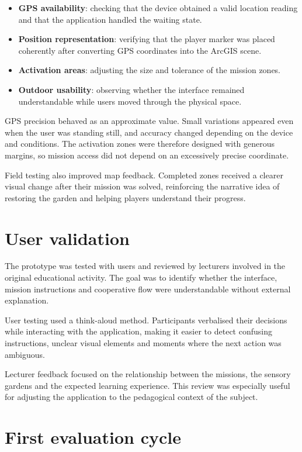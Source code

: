\begin{itemize}
    \item \textbf{GPS availability}: checking that the device obtained a valid location reading and that the application handled the waiting state.
    \item \textbf{Position representation}: verifying that the player marker was placed coherently after converting GPS coordinates into the ArcGIS scene.
    \item \textbf{Activation areas}: adjusting the size and tolerance of the mission zones.
    \item \textbf{Outdoor usability}: observing whether the interface remained understandable while users moved through the physical space.
\end{itemize}

GPS precision behaved as an approximate value. Small variations appeared even when the user was standing still, and accuracy changed depending on the device and conditions. The activation zones were therefore designed with generous margins, so mission access did not depend on an excessively precise coordinate.

Field testing also improved map feedback. Completed zones received a clearer visual change after their mission was solved, reinforcing the narrative idea of restoring the garden and helping players understand their progress.

\section{User validation}

The prototype was tested with users and reviewed by lecturers involved in the original educational activity. The goal was to identify whether the interface, mission instructions and cooperative flow were understandable without external explanation.

User testing used a think-aloud method. Participants verbalised their decisions while interacting with the application, making it easier to detect confusing instructions, unclear visual elements and moments where the next action was ambiguous.

Lecturer feedback focused on the relationship between the missions, the sensory gardens and the expected learning experience. This review was especially useful for adjusting the application to the pedagogical context of the subject.



\section{First evaluation cycle}

